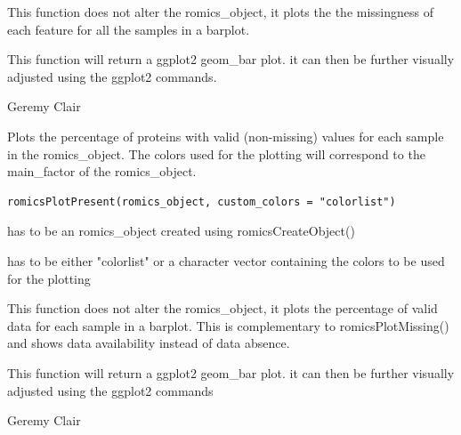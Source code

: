 \documentclass[a4paper]{book}
\begin{document}
%
\begin{Details}
This function does not alter the romics\_object, it plots the the missingness of each feature for all the samples in a barplot.
\end{Details}
%
\begin{Value}
This function will return a ggplot2 geom\_bar plot. it can then be further visually adjusted using the ggplot2 commands.
\end{Value}
%
\begin{Author}
Geremy Clair
\end{Author}
%
\begin{Description}
Plots the percentage of proteins with valid (non-missing) values for each sample in the romics\_object. The colors used for the plotting will correspond to the main\_factor of the romics\_object.
\end{Description}
%
\begin{Usage}
\begin{verbatim}
romicsPlotPresent(romics_object, custom_colors = "colorlist")
\end{verbatim}
\end{Usage}
%
\begin{Arguments}
\begin{ldescription}
\item[\code{romics\_object}] has to be an romics\_object created using romicsCreateObject()

\item[\code{custom\_colors}] has to be either "colorlist" or a character vector containing the colors to be used for the plotting
\end{ldescription}
\end{Arguments}
%
\begin{Details}
This function does not alter the romics\_object, it plots the percentage of valid data for each sample in a barplot. This is complementary to romicsPlotMissing() and shows data availability instead of data absence.
\end{Details}
%
\begin{Value}
This function will return a ggplot2 geom\_bar plot. it can then be further visually adjusted using the ggplot2 commands
\end{Value}
%
\begin{Author}
Geremy Clair
\end{Author}
\end{document}
